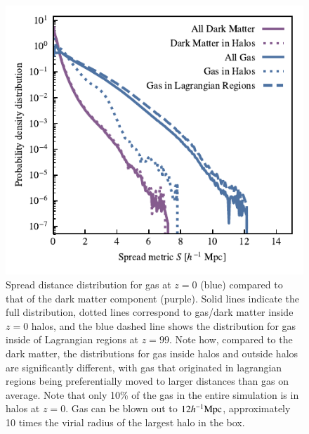 \begin{figure}
    \centering
    \includegraphics{figures/s50j7kAHF/distance_plot_split_by_component+AHF.pdf}
    \vspace{-0.5cm}
    \caption{Spread distance distribution for gas at $z=0$ (blue) compared to that of the dark matter component (purple).  Solid lines indicate the full distribution, dotted lines correspond to gas/dark matter inside $z=0$ halos, and the blue dashed line shows the distribution for gas inside of Lagrangian regions at $z=99$.   
    Note how, compared to the dark matter, the distributions for gas inside
    halos and outside halos are significantly different, with gas that
    originated in lagrangian regions being preferentially moved to larger
    distances than gas on average. Note that only 10\% of the gas in the
    entire simulation is in halos at $z=0$. Gas can be blown out to
    $12h^{-1}{\rm Mpc}{}$, approximately 10 times the virial radius of the largest halo
    in the box.}
    \vspace{-0.5cm}
    \label{fig:distbaryon}
\end{figure}


